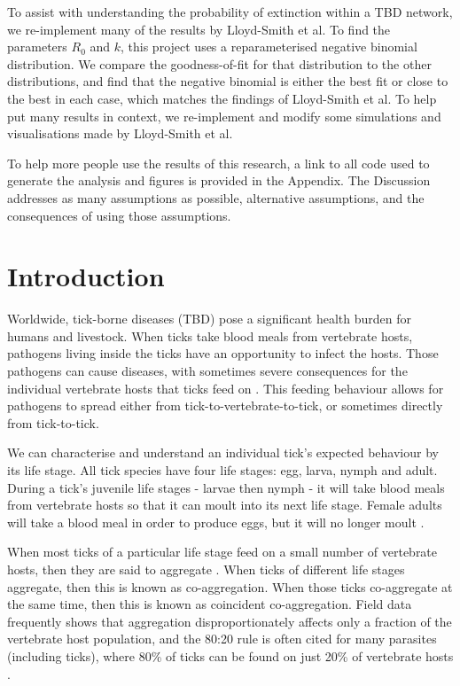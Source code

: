 \documentclass{article}
\begin{document}
To assist with understanding the probability of extinction within a TBD network, we re-implement many of the results by Lloyd-Smith et al. To find the parameters $ R_0 $ and $ k $, this project uses a reparameterised negative binomial distribution. We compare the goodness-of-fit for that distribution to the other distributions, and find that the negative binomial is either the best fit or close to the best in each case, which matches the findings of Lloyd-Smith et al. To help put many results in context, we re-implement and modify some simulations and visualisations made by Lloyd-Smith et al. 

To help more people use the results of this research, a link to all code used to generate the analysis and figures is provided in the Appendix. The Discussion addresses as many assumptions as possible, alternative assumptions, and the consequences of using those assumptions.

\thispagestyle{empty}
\addtocounter{page}{-1}

\newpage

\tableofcontents

\thispagestyle{empty}
\addtocounter{page}{-1}

\newpage

\section{Introduction}

Worldwide, tick-borne diseases (TBD) pose a significant health burden for humans and livestock. When ticks take blood meals from vertebrate hosts, pathogens living inside the ticks have an opportunity to infect the hosts. Those pathogens can cause diseases, with sometimes severe consequences for the individual vertebrate hosts that ticks feed on \cite{Johnson2023e}. This feeding behaviour allows for pathogens to spread either from tick-to-vertebrate-to-tick, or sometimes directly from tick-to-tick.

We can characterise and understand an individual tick's expected behaviour by its life stage. All tick species have four life stages: egg, larva, nymph and adult. During a tick's juvenile life stages - larvae then nymph - it will take blood meals from vertebrate hosts so that it can moult into its next life stage. Female adults will take a blood meal in order to produce eggs, but it will no longer moult \cite{Johnson2023a}.

When most ticks of a particular life stage feed on a small number of vertebrate hosts, then they are said to aggregate \cite{JohnstoneRobertson2020}. When ticks of different life stages aggregate, then this is known as co-aggregation. When those ticks co-aggregate at the same time, then this is known as coincident co-aggregation. Field data frequently shows that aggregation disproportionately affects only a fraction of the vertebrate host population, and the 80:20 rule is often cited for many parasites (including ticks), where 80\% of ticks can be found on just 20\% of vertebrate hosts \cite{Woolhouse1997}.
\end{document}
